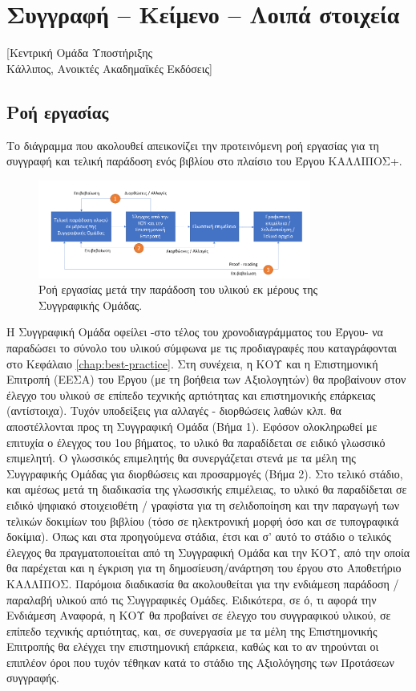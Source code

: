 \chapter{Συγγραφή – Κείμενο – Λοιπά στοιχεία}\label{chap:writing}
[Κεντρική Ομάδα Υποστήριξης\\  Κάλλιπος, Ανοικτές Ακαδημαϊκές Εκδόσεις]

\section{Ροή εργασίας}
Το διάγραμμα που ακολουθεί απεικονίζει την προτεινόμενη ροή εργασίας για τη συγγραφή
και τελική παράδοση ενός βιβλίου στο πλαίσιο του Έργου ΚΑΛΛΙΠΟΣ+.

\begin{figure} \centering
\renewcommand{\figurename}{Σχήμα}
\includegraphics[width=0.8\textwidth]{images/work_flow.png}
\caption[Ροή εργασίας.]{Ροή εργασίας μετά την παράδοση του υλικού εκ μέρους
της Συγγραφικής Ομάδας.}
\label{fig:work_flow}
\end{figure}

Η Συγγραφική Ομάδα οφείλει -στο τέλος του χρονοδιαγράμματος του Έργου- να
παραδώσει το σύνολο του υλικού σύμφωνα με τις προδιαγραφές που καταγράφονται στο
Κεφάλαιο \ref{chap:best-practice}. Στη συνέχεια, η ΚΟΥ και η Επιστημονική Επιτροπή (ΕΕΣΑ) του Έργου (με
τη βοήθεια των Αξιολογητών) θα προβαίνουν στον έλεγχο του υλικού σε επίπεδο τεχνικής
αρτιότητας και επιστημονικής επάρκειας (αντίστοιχα). Τυχόν υποδείξεις για αλλαγές -
διορθώσεις λαθών κλπ. θα αποστέλλονται προς τη Συγγραφική Ομάδα (Βήμα 1). Εφόσον
ολοκληρωθεί με επιτυχία ο έλεγχος του 1ου βήματος, το υλικό θα παραδίδεται σε ειδικό
γλωσσικό επιμελητή. Ο γλωσσικός επιμελητής θα συνεργάζεται στενά με τα μέλη της
Συγγραφικής Ομάδας για διορθώσεις και προσαρμογές (Βήμα 2). Στο τελικό στάδιο, και
αμέσως μετά τη διαδικασία της γλωσσικής επιμέλειας, το υλικό θα παραδίδεται σε ειδικό
ψηφιακό στοιχειοθέτη / γραφίστα για τη σελιδοποίηση και την παραγωγή των τελικών
δοκιμίων του βιβλίου (τόσο σε ηλεκτρονική μορφή όσο και σε τυπογραφικά δοκίμια). Όπως
και στα προηγούμενα στάδια, έτσι και σ’ αυτό το στάδιο ο τελικός έλεγχος θα
πραγματοποιείται από τη Συγγραφική Ομάδα και την ΚΟΥ, από την οποία θα παρέχεται
και η έγκριση για τη δημοσίευση/ανάρτηση του έργου στο Αποθετήριο ΚΑΛΛΙΠΟΣ.
Παρόμοια διαδικασία θα ακολουθείται για την ενδιάμεση παράδοση / παραλαβή υλικού
από τις Συγγραφικές Ομάδες. Ειδικότερα, σε ό, τι αφορά την Ενδιάμεση Αναφορά, η ΚΟΥ
θα προβαίνει σε έλεγχο του συγγραφικού υλικού, σε επίπεδο τεχνικής αρτιότητας, και, σε
συνεργασία με τα μέλη της Επιστημονικής Επιτροπής θα ελέγχει την επιστημονική
επάρκεια, καθώς και το αν τηρούνται οι επιπλέον όροι που τυχόν τέθηκαν κατά το στάδιο
της Αξιολόγησης των Προτάσεων συγγραφής.

